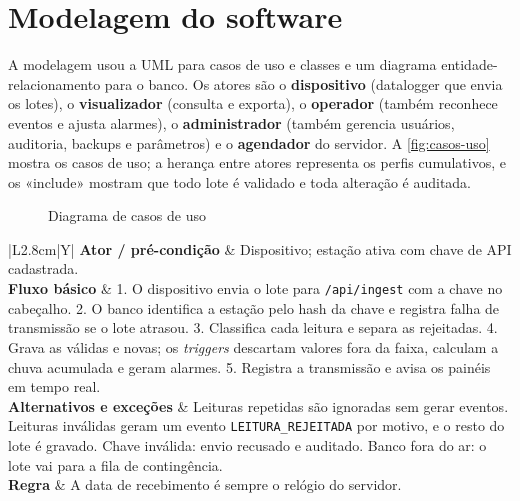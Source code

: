 \chapter{Modelagem do software}\label{cap:modelagem}

A modelagem usou a UML para casos de uso e classes \parencite{booch2006} e um diagrama entidade-relacionamento para o banco. Os atores são o \textbf{dispositivo} (datalogger que envia os lotes), o \textbf{visualizador} (consulta e exporta), o \textbf{operador} (também reconhece eventos e ajusta alarmes), o \textbf{administrador} (também gerencia usuários, auditoria, backups e parâmetros) e o \textbf{agendador} do servidor. A \autoref{fig:casos-uso} mostra os casos de uso; a herança entre atores representa os perfis cumulativos, e os «include» mostram que todo lote é validado e toda alteração é auditada.

\begin{figure}[htb]
  \caption{Diagrama de casos de uso}\label{fig:casos-uso}
  \centering
  \resizebox{0.74\textwidth}{!}{}
\end{figure}

\newcommand{\linhauc}[2]{\textbf{#1} & #2 \\ \hline}

\begin{quadro}[htb]
  \caption{Caso de uso UC01 -- Enviar lote de leituras}\label{qua:uc01}
  \footnotesize
  \begin{tabularx}{\textwidth}{|L{2.8cm}|Y|}
    \hline
    \linhauc{Ator / pré-condição}{Dispositivo; estação ativa com chave de API cadastrada.}
    \textbf{Fluxo básico} & 1. O dispositivo envia o lote para \texttt{/api/ingest} com a chave no cabeçalho. 2. O banco identifica a estação pelo hash da chave e registra falha de transmissão se o lote atrasou. 3. Classifica cada leitura e separa as rejeitadas. 4. Grava as válidas e novas; os \textit{triggers} descartam valores fora da faixa, calculam a chuva acumulada e geram alarmes. 5. Registra a transmissão e avisa os painéis em tempo real. \\ \hline
    \textbf{Alternativos e exceções} & Leituras repetidas são ignoradas sem gerar eventos. Leituras inválidas geram um evento \texttt{LEITURA\_REJEITADA} por motivo, e o resto do lote é gravado. Chave inválida: envio recusado e auditado. Banco fora do ar: o lote vai para a fila de contingência. \\ \hline
    \linhauc{Regra}{A data de recebimento é sempre o relógio do servidor.}
  \end{tabularx}
\end{quadro}

